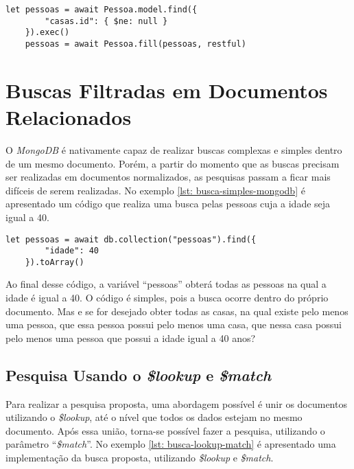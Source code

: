 \begin{lstlisting}[style=ES6, caption={\textit{inner join} de Documentos Com o \textit{Alpha Restful\label{lst: inner-join-alpha-restful}}}]
	let pessoas = await Pessoa.model.find({
	    "casas.id": { $ne: null }
	}).exec()
	pessoas = await Pessoa.fill(pessoas, restful)
\end{lstlisting}

\section{Buscas Filtradas em Documentos Relacionados\label{section: buscas-filtradas-documentos-relacionados}}

O \textit{MongoDB} é nativamente capaz de realizar buscas complexas e simples dentro de um mesmo documento. Porém, a partir do momento que as buscas precisam ser realizadas em documentos normalizados, as pesquisas passam a ficar mais difíceis de serem realizadas. No exemplo \ref{lst: busca-simples-mongodb} é apresentado um código que realiza uma busca pelas pessoas cuja a idade seja igual a 40.


\begin{lstlisting}[style=ES6, caption={Busca de Pessoas com Idade Igual a 40\label{lst: busca-simples-mongodb}}]
    let pessoas = await db.collection("pessoas").find({
        "idade": 40
    }).toArray()
\end{lstlisting}

Ao final desse código, a variável ``pessoas'' obterá todas as pessoas na qual a idade é igual a 40. O código é simples, pois a busca ocorre dentro do próprio documento. Mas e se for desejado obter todas as casas, na qual existe pelo menos uma pessoa, que essa pessoa possui pelo menos uma casa, que nessa casa possui pelo menos uma pessoa que possui a idade igual a 40 anos?

\subsection{Pesquisa Usando o \textit{\$lookup} e \textit{\$match}\label{subsection: pesquisa-lookup-match}}

Para realizar a pesquisa proposta, uma abordagem possível é unir os documentos utilizando o \textit{\$lookup}, até o nível que todos os dados estejam no mesmo documento. Após essa união, torna-se possível fazer a pesquisa, utilizando o parâmetro ``\textit{\$match}''. No exemplo \ref{lst: busca-lookup-match} é apresentado uma implementação da busca proposta, utilizando \textit{\$lookup} e \textit{\$match}.

